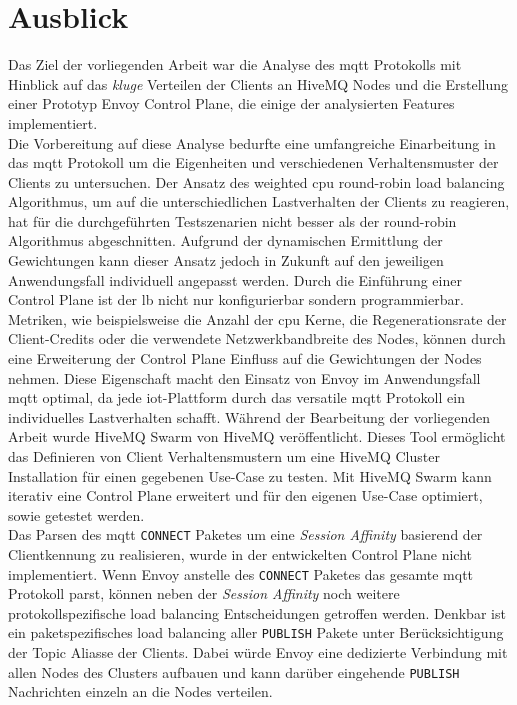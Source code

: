 \section{Ausblick}
Das Ziel der vorliegenden Arbeit war die Analyse des \ac{mqtt} Protokolls mit Hinblick auf das \textit{kluge} Verteilen der Clients an HiveMQ Nodes und die Erstellung einer Prototyp Envoy Control Plane, die einige der analysierten Features implementiert.
\\
Die Vorbereitung auf diese Analyse bedurfte eine umfangreiche Einarbeitung in das \ac{mqtt} Protokoll um die Eigenheiten und verschiedenen Verhaltensmuster der Clients zu untersuchen.
Der Ansatz des weighted \ac{cpu} round-robin load balancing Algorithmus, um auf die unterschiedlichen Lastverhalten der Clients zu reagieren, hat für die durchgeführten Testszenarien nicht besser als der round-robin Algorithmus abgeschnitten. Aufgrund der dynamischen Ermittlung der Gewichtungen kann dieser Ansatz jedoch in Zukunft auf den jeweiligen Anwendungsfall individuell angepasst werden.
Durch die Einführung einer Control Plane ist der \acl{lb} nicht nur konfigurierbar sondern programmierbar.
Metriken, wie beispielsweise die Anzahl der \ac{cpu} Kerne, die Regenerationsrate der Client-Credits oder die verwendete Netzwerkbandbreite des Nodes, können durch eine Erweiterung der Control Plane Einfluss auf die Gewichtungen der Nodes nehmen.
Diese Eigenschaft macht den Einsatz von Envoy im Anwendungsfall \ac{mqtt} optimal, da jede \ac{iot}-Plattform durch das versatile \ac{mqtt} Protokoll ein individuelles Lastverhalten schafft.
Während der Bearbeitung der vorliegenden Arbeit wurde HiveMQ Swarm von HiveMQ veröffentlicht. Dieses Tool ermöglicht das Definieren von Client Verhaltensmustern um eine HiveMQ Cluster Installation für einen gegebenen Use-Case zu testen.
Mit HiveMQ Swarm kann iterativ eine Control Plane erweitert und für den eigenen Use-Case optimiert, sowie getestet werden.
\\
Das Parsen des \ac{mqtt} \verb|CONNECT| Paketes um eine \textit{Session Affinity} basierend der Clientkennung zu realisieren, wurde in der entwickelten Control Plane nicht implementiert.
Wenn Envoy anstelle des \verb|CONNECT| Paketes das gesamte \ac{mqtt} Protokoll parst, können neben der \textit{Session Affinity} noch weitere protokollspezifische load balancing Entscheidungen getroffen werden.
Denkbar ist ein paketspezifisches load balancing aller \verb|PUBLISH| Pakete unter Berücksichtigung der Topic Aliasse der Clients. Dabei würde Envoy eine dedizierte Verbindung mit allen Nodes des Clusters aufbauen und kann darüber eingehende \verb|PUBLISH| Nachrichten einzeln an die Nodes verteilen.
